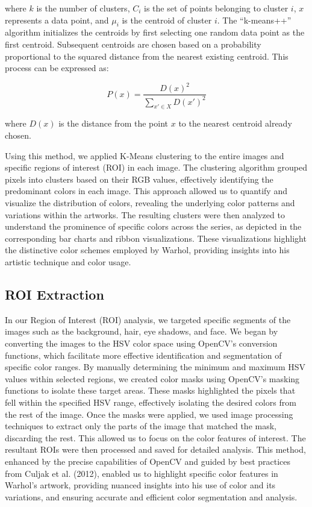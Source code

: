 \documentclass{article}
\begin{document}
where \(k\) is the number of clusters, \(C_i\) is the set of points
belonging to cluster \(i\), \(x\) represents a data point, and \(\mu_i\)
is the centroid of cluster \(i\). The ``k-means++'' algorithm
initializes the centroids by first selecting one random data point as
the first centroid. Subsequent centroids are chosen based on a
probability proportional to the squared distance from the nearest
existing centroid. This process can be expressed as:

\begin{equation}
  P(x) = \frac{D(x)^2}{\sum_{x' \in X} D(x')^2}
\end{equation}

where \(D(x)\) is the distance from the point \(x\) to the nearest
centroid already chosen.

Using this method, we applied K-Means clustering to the entire images
and specific regions of interest (ROI) in each image. The clustering
algorithm grouped pixels into clusters based on their RGB values,
effectively identifying the predominant colors in each image. This
approach allowed us to quantify and visualize the distribution of
colors, revealing the underlying color patterns and variations within
the artworks. The resulting clusters were then analyzed to understand
the prominence of specific colors across the series, as depicted in the
corresponding bar charts and ribbon visualizations. These visualizations
highlight the distinctive color schemes employed by Warhol, providing
insights into his artistic technique and color usage.

\hypertarget{roi-extraction}{%
\subsection{ROI Extraction}\label{roi-extraction}}

In our Region of Interest (ROI) analysis, we targeted specific segments
of the images such as the background, hair, eye shadows, and face. We
began by converting the images to the HSV color space using OpenCV's
conversion functions, which facilitate more effective identification and
segmentation of specific color ranges. By manually determining the
minimum and maximum HSV values within selected regions, we created color
masks using OpenCV's masking functions to isolate these target areas.
These masks highlighted the pixels that fell within the specified HSV
range, effectively isolating the desired colors from the rest of the
image. Once the masks were applied, we used image processing techniques
to extract only the parts of the image that matched the mask, discarding
the rest. This allowed us to focus on the color features of interest.
The resultant ROIs were then processed and saved for detailed analysis.
This method, enhanced by the precise capabilities of OpenCV and guided
by best practices from Culjak et al. (2012), enabled us to highlight
specific color features in Warhol's artwork, providing nuanced insights
into his use of color and its variations, and ensuring accurate and
efficient color segmentation and analysis.
\end{document}
